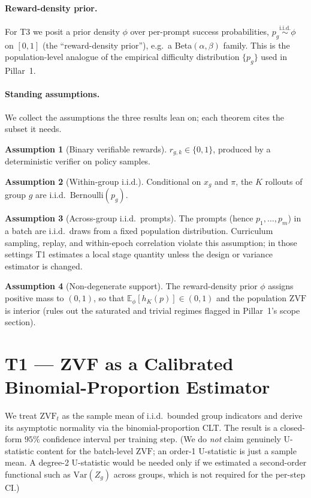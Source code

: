 \documentclass[11pt]{article}
\theoremstyle{plain}
\theoremstyle{definition}
\newtheorem{assumption}{Assumption}
\theoremstyle{remark}
\newcommand{\ZVF}{\ensuremath{\mathrm{ZVF}}}
\newcommand{\Var}{\ensuremath{\mathrm{Var}}}
\newcommand{\E}{\mathbb{E}}
\newcommand{\1}{\mathbb{1}}
\newcommand{\Bern}{\mathrm{Bernoulli}}
\begin{document}
\paragraph{Reward-density prior.} For T3 we posit a prior density $\phi$ over
per-prompt success probabilities, $p_g \overset{\text{i.i.d.}}{\sim}\phi$ on
$[0,1]$ (the ``reward-density prior''), e.g.\ a Beta$(\alpha,\beta)$ family.
This is the population-level analogue of the empirical difficulty distribution
$\{p_g\}$ used in Pillar~1.

\paragraph{Standing assumptions.} We collect the assumptions the three results
lean on; each theorem cites the subset it needs.
\begin{assumption}[Binary verifiable rewards]\label{ass:binary}
$r_{g,k}\in\{0,1\}$, produced by a deterministic verifier on policy samples.
\end{assumption}
\begin{assumption}[Within-group i.i.d.]\label{ass:within-iid}
Conditional on $x_g$ and $\pi$, the $K$ rollouts of group $g$ are i.i.d.\
$\Bern(p_g)$.
\end{assumption}
\begin{assumption}[Across-group i.i.d.\ prompts]\label{ass:across-iid}
The prompts (hence $p_1,\dots,p_m$) in a batch are i.i.d.\ draws from a fixed
population distribution. Curriculum sampling, replay, and within-epoch
correlation violate this assumption; in those settings T1 estimates a local
stage quantity unless the design or variance estimator is changed.
\end{assumption}
\begin{assumption}[Non-degenerate support]\label{ass:nondegen}
The reward-density prior $\phi$ assigns positive mass to $(0,1)$, so that
$\E_\phi[h_K(p)] \in (0,1)$ and the population \ZVF{} is interior (rules out
the saturated and trivial regimes flagged in Pillar~1's scope section).
\end{assumption}

\section{T1 --- ZVF as a Calibrated Binomial-Proportion Estimator}\label{sec:T1}
We treat $\ZVF_t$ as the sample mean of i.i.d.\ bounded group indicators and
derive its asymptotic normality via the binomial-proportion CLT. The result is
a closed-form $95\%$ confidence interval per training step. (We do \emph{not}
claim genuinely U-statistic content for the batch-level \ZVF{}; an order-1
U-statistic is just a sample mean. A degree-2 U-statistic would be needed only
if we estimated a second-order functional such as $\Var(Z_g)$ across groups,
which is not required for the per-step CI.)
\end{document}
